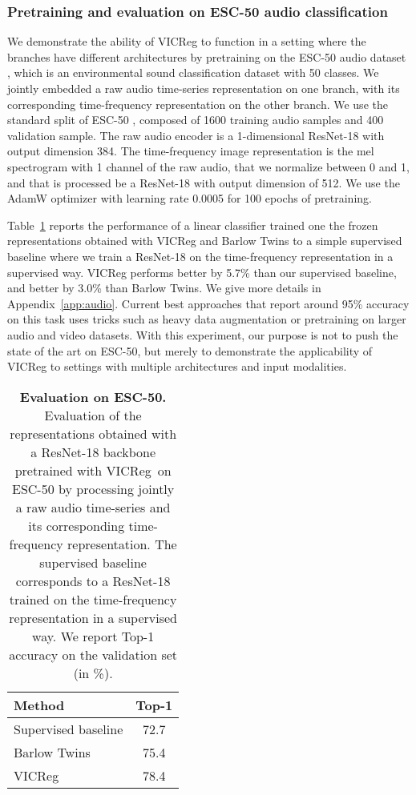\documentclass{article}
\newcommand{\algo}{VICReg}
\begin{document}
\subsubsection{Pretraining and evaluation on ESC-50 audio classification}

We demonstrate the ability of VICReg to function in a setting where the branches have different architectures by pretraining on the ESC-50 audio dataset \cite{piczak2015dataset}, which is an environmental sound classification dataset with 50 classes. We jointly embedded a raw audio time-series representation on one branch, with its corresponding time-frequency representation on the other branch. We use the standard split of ESC-50 \cite{piczak2015dataset}, composed of 1600 training audio samples and 400 validation sample. The raw audio encoder is a 1-dimensional ResNet-18 with output dimension 384. The time-frequency image representation is the mel spectrogram with 1 channel of the raw audio, that we normalize between 0 and 1, and that is processed be a ResNet-18 with output dimension of 512. We use the AdamW optimizer with learning rate 0.0005 for 100 epochs of pretraining.

Table~\ref{tab:audio_results} reports the performance of a linear classifier trained one the frozen representations obtained with VICReg and Barlow Twins to a simple supervised baseline where we train a ResNet-18 on the time-frequency representation in a supervised way. VICReg performs better by 5.7\% than our supervised baseline, and better by 3.0\% than Barlow Twins. We give more details in Appendix~\ref{app:audio}. Current best approaches that report around 95\% accuracy on this task uses tricks such as heavy data augmentation or pretraining on larger audio and video datasets. With this experiment, our purpose is not to push the state of the art on ESC-50, but merely to demonstrate the applicability of VICReg to settings with multiple architectures and input modalities.

\begin{table}[t]
\caption{\textbf{Evaluation on ESC-50.} Evaluation of the representations obtained with a ResNet-18 backbone pretrained with \algo \ on ESC-50 \cite{piczak2015dataset} by processing jointly a raw audio time-series and its corresponding time-frequency representation. The supervised baseline corresponds to a ResNet-18 trained on the time-frequency representation in a supervised way. We report Top-1 accuracy on the validation set (in \%).}
\centering
\vspace{-2mm}
\label{tab:audio_results}
\begin{tabular}{lc}
\toprule
Method & Top-1 \\
\midrule
Supervised baseline  & 72.7 \\
Barlow Twins  & 75.4 \\
\algo         & 78.4 \\
\bottomrule
\end{tabular}
\end{table}
\end{document}
